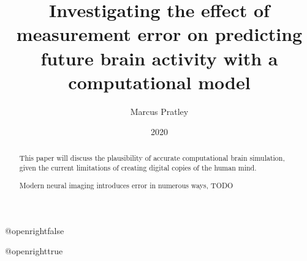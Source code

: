 \documentclass[10.5pt,twoside,openright]{report}
\title{Investigating the effect of measurement error on predicting future brain
activity with a computational model}
\author{Marcus Pratley}
\date{2020}
\begin{document}
\csname @openrightfalse\endcsname

\maketitle

\declaration

\dedication{With thanks to Frances Hutchins and Prof. Marcus Kaiser, who have both been a great help throughout the unusually fraught environment of creating this dissertation. \\ \vspace{1ex} Extra thanks also to my family, and parents in particular, for all their love and support over the course of my degree. }

\begin{abstract}
This paper will discuss the plausibility of accurate computational brain
simulation, given the current limitations of creating digital copies of the
human mind. 

Modern neural imaging introduces error in numerous ways, TODO
\end{abstract}

\def\table{\def\figurename{Table}\figure}
\let\endtable\endfigure
\renewcommand\listfigurename{List of Figures and Tables}

\tableofcontents
\listoffigures
\csname @openrighttrue\endcsname




% 



\printbibliography[heading=bibintoc]
\end{document}
